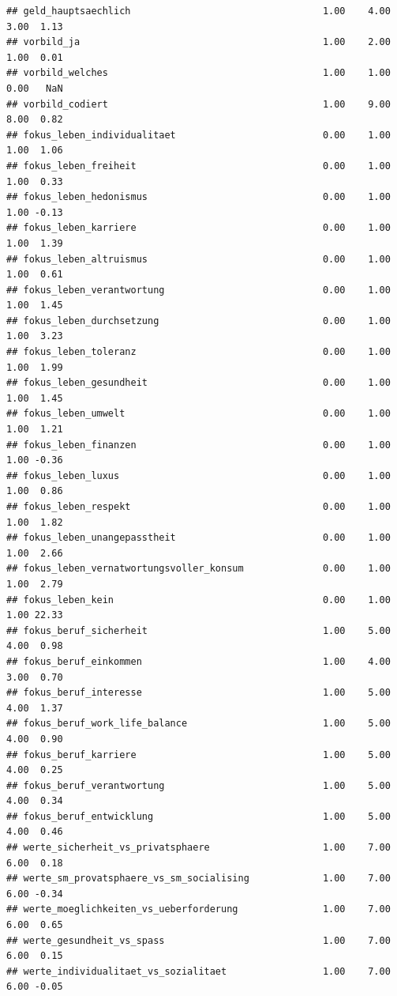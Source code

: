 \documentclass[
]{book}
\begin{document}
\begin{verbatim}
## geld_hauptsaechlich                                  1.00    4.00    3.00  1.13
## vorbild_ja                                           1.00    2.00    1.00  0.01
## vorbild_welches                                      1.00    1.00    0.00   NaN
## vorbild_codiert                                      1.00    9.00    8.00  0.82
## fokus_leben_individualitaet                          0.00    1.00    1.00  1.06
## fokus_leben_freiheit                                 0.00    1.00    1.00  0.33
## fokus_leben_hedonismus                               0.00    1.00    1.00 -0.13
## fokus_leben_karriere                                 0.00    1.00    1.00  1.39
## fokus_leben_altruismus                               0.00    1.00    1.00  0.61
## fokus_leben_verantwortung                            0.00    1.00    1.00  1.45
## fokus_leben_durchsetzung                             0.00    1.00    1.00  3.23
## fokus_leben_toleranz                                 0.00    1.00    1.00  1.99
## fokus_leben_gesundheit                               0.00    1.00    1.00  1.45
## fokus_leben_umwelt                                   0.00    1.00    1.00  1.21
## fokus_leben_finanzen                                 0.00    1.00    1.00 -0.36
## fokus_leben_luxus                                    0.00    1.00    1.00  0.86
## fokus_leben_respekt                                  0.00    1.00    1.00  1.82
## fokus_leben_unangepasstheit                          0.00    1.00    1.00  2.66
## fokus_leben_vernatwortungsvoller_konsum              0.00    1.00    1.00  2.79
## fokus_leben_kein                                     0.00    1.00    1.00 22.33
## fokus_beruf_sicherheit                               1.00    5.00    4.00  0.98
## fokus_beruf_einkommen                                1.00    4.00    3.00  0.70
## fokus_beruf_interesse                                1.00    5.00    4.00  1.37
## fokus_beruf_work_life_balance                        1.00    5.00    4.00  0.90
## fokus_beruf_karriere                                 1.00    5.00    4.00  0.25
## fokus_beruf_verantwortung                            1.00    5.00    4.00  0.34
## fokus_beruf_entwicklung                              1.00    5.00    4.00  0.46
## werte_sicherheit_vs_privatsphaere                    1.00    7.00    6.00  0.18
## werte_sm_provatsphaere_vs_sm_socialising             1.00    7.00    6.00 -0.34
## werte_moeglichkeiten_vs_ueberforderung               1.00    7.00    6.00  0.65
## werte_gesundheit_vs_spass                            1.00    7.00    6.00  0.15
## werte_individualitaet_vs_sozialitaet                 1.00    7.00    6.00 -0.05

\end{verbatim}
\end{document}
